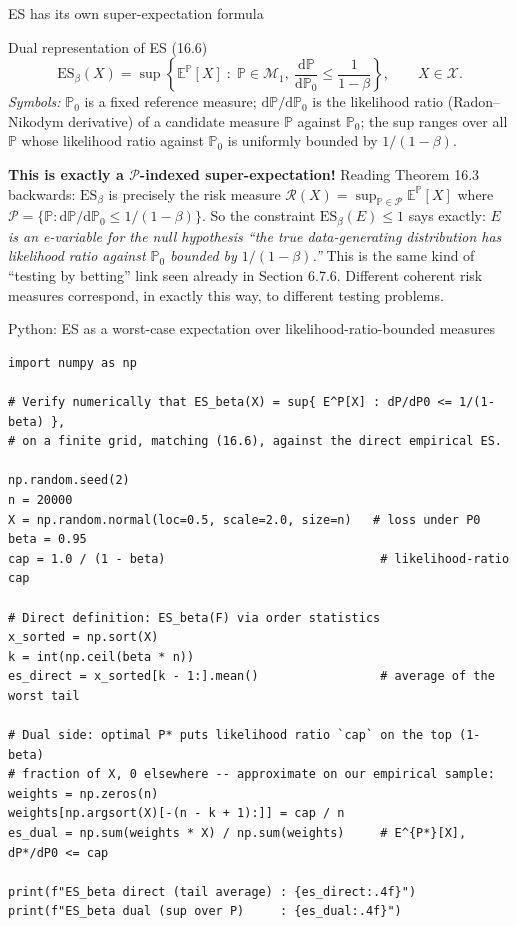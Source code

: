 \documentclass[aspectratio=169,10pt]{beamer}
\newcommand{\PP}{\mathbb{P}}
\newcommand{\EE}{\mathbb{E}}
\newcommand{\1}{\mathbb{1}}
\begin{document}
\begin{frame}{ES has its own super-expectation formula}

\begin{block}{Dual representation of ES (16.6)}
\[
\mathrm{ES}_\beta(X) = \sup\left\{ \EE^{\PP}[X] \;:\; \PP \in \mathcal M_1,\ \frac{\mathrm d \PP}{\mathrm d \PP_0} \le \frac{1}{1-\beta} \right\}, \qquad X \in \mathcal X.
\]
\emph{Symbols:} $\PP_0$ is a fixed reference measure; $\mathrm d\PP/\mathrm d\PP_0$ is the likelihood ratio (Radon--Nikodym derivative) of a candidate measure $\PP$ against $\PP_0$; the sup ranges over all $\PP$ whose likelihood ratio against $\PP_0$ is uniformly bounded by $1/(1-\beta)$.
\end{block}

\textbf{This is exactly a $\mathcal P$-indexed super-expectation!} Reading Theorem 16.3 backwards: $\mathrm{ES}_\beta$ is precisely the risk measure $\mathcal R(X)=\sup_{\PP\in\mathcal P}\EE^{\PP}[X]$ where $\mathcal P = \{\PP : \mathrm d\PP/\mathrm d\PP_0 \le 1/(1-\beta)\}$. So the constraint $\mathrm{ES}_\beta(E)\le 1$ says exactly: \emph{$E$ is an e-variable for the null hypothesis ``the true data-generating distribution has likelihood ratio against $\PP_0$ bounded by $1/(1-\beta)$.''} This is the same kind of ``testing by betting'' link seen already in Section 6.7.6. Different coherent risk measures correspond, in exactly this way, to different testing problems.

\end{frame}

\begin{frame}[fragile]{Python: ES as a worst-case expectation over likelihood-ratio-bounded measures}

\begin{lstlisting}
import numpy as np

# Verify numerically that ES_beta(X) = sup{ E^P[X] : dP/dP0 <= 1/(1-beta) },
# on a finite grid, matching (16.6), against the direct empirical ES.

np.random.seed(2)
n = 20000
X = np.random.normal(loc=0.5, scale=2.0, size=n)   # loss under P0
beta = 0.95
cap = 1.0 / (1 - beta)                              # likelihood-ratio cap

# Direct definition: ES_beta(F) via order statistics
x_sorted = np.sort(X)
k = int(np.ceil(beta * n))
es_direct = x_sorted[k - 1:].mean()                 # average of the worst tail

# Dual side: optimal P* puts likelihood ratio `cap` on the top (1-beta)
# fraction of X, 0 elsewhere -- approximate on our empirical sample:
weights = np.zeros(n)
weights[np.argsort(X)[-(n - k + 1):]] = cap / n
es_dual = np.sum(weights * X) / np.sum(weights)     # E^{P*}[X], dP*/dP0 <= cap

print(f"ES_beta direct (tail average) : {es_direct:.4f}")
print(f"ES_beta dual (sup over P)     : {es_dual:.4f}")
\end{lstlisting}

\end{frame}
\end{document}
